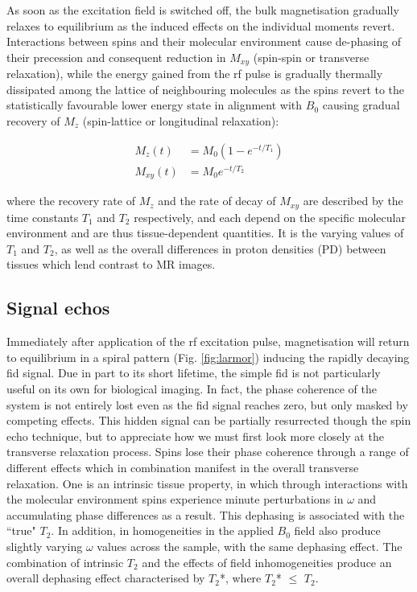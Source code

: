 As soon as the excitation field is switched off, the bulk magnetisation gradually relaxes to equilibrium as the induced effects on the individual moments revert.
Interactions between spins and their molecular environment cause de-phasing of their precession and consequent reduction in $M_{xy}$ (spin-spin or transverse relaxation), while the energy gained from the \gls{rf} pulse is gradually thermally dissipated among the lattice of neighbouring molecules as the spins revert to the statistically favourable lower energy state in alignment with $B_0$ causing gradual recovery of $M_z$ (spin-lattice or longitudinal relaxation):

\begin{align}
  M_z(t)  &= M_0 (1-e^{-t/T_1}) \\
  M_{xy}(t) &= M_0 e^{-t/T_2} \label{eq:recovery}
\end{align}

where the recovery rate of $M_z$ and the rate of decay of $M_{xy}$ are described by the time constants $T_1$ and $T_2$ respectively, and each depend on the specific molecular environment and are thus tissue-dependent quantities.
It is the varying values of $T_1$ and $T_2$, as well as the overall differences in proton densities (PD) between tissues which lend contrast to MR images.

\subsection{Signal echos}\label{sec:echos}

Immediately after application of the \gls{rf} excitation pulse, magnetisation will return to equilibrium in a spiral pattern (Fig. \ref{fig:larmor}) inducing the rapidly decaying \gls{fid} signal.
Due in part to its short lifetime, the simple \gls{fid} is not particularly useful on its own for biological imaging.
In fact, the phase coherence of the system is not entirely lost even as the \gls{fid} signal reaches zero, but only masked by competing effects.
This hidden signal can be partially resurrected though the spin echo technique, but to appreciate how we must first look more closely at the transverse relaxation process.
Spins lose their phase coherence through a range of different effects which in combination manifest in the overall transverse relaxation.
One is an intrinsic tissue property, in which through interactions with the molecular environment spins experience minute perturbations in $\omega$ and accumulating phase differences as a result.
This dephasing is associated with the ``true" $T_2$.
In addition, in homogeneities in the applied $B_0$ field also produce slightly varying $\omega$ values across the sample, with the same dephasing effect.
The combination of intrinsic $T_2$ and the effects of field inhomogeneities produce an overall dephasing effect characterised by $T_2$*, where  $T_2$* $\leqslant$ $T_2$.


